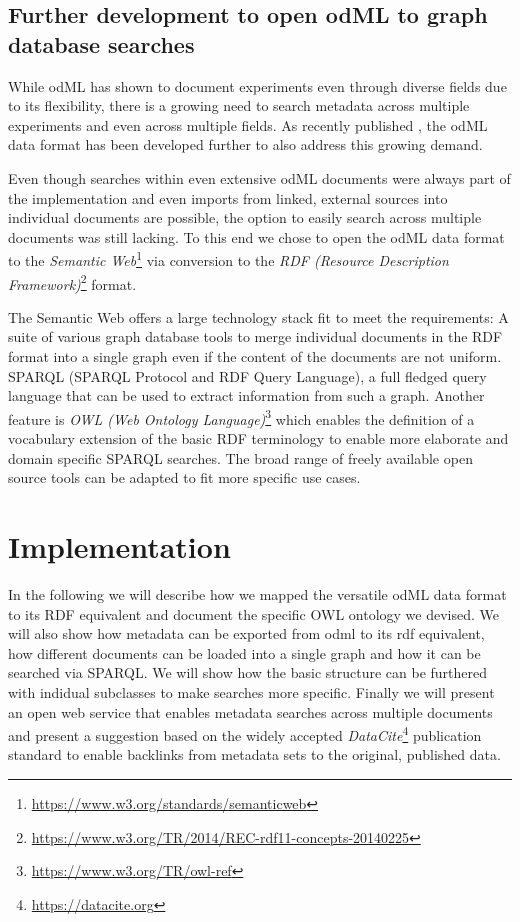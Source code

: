 \documentclass{article}
\begin{document}
\subsection{Further development to open odML to graph database searches}

While odML has shown to document experiments even through diverse fields due to its flexibility, there is a growing need to search metadata across multiple experiments and even across multiple fields. As recently published \cite{Sprenger_2019}, the odML data format has been developed further to also address this growing demand.

Even though searches within even extensive odML documents were always part of the implementation and even imports from linked, external sources into individual documents are possible, the option to easily search across multiple documents was still lacking. To this end we chose to open the odML data format to the \textit{Semantic Web}\footnote{\url{https://www.w3.org/standards/semanticweb}} via conversion to the \textit{RDF (Resource Description Framework)}\footnote{\url{https://www.w3.org/TR/2014/REC-rdf11-concepts-20140225}} format.

The Semantic Web offers a large technology stack fit to meet the requirements: A suite of various graph database tools to merge individual documents in the RDF format into a single graph even if the content of the documents are not uniform. SPARQL (SPARQL Protocol and RDF Query Language), a full fledged query language that can be used to extract information from such a graph. Another feature is \textit{OWL (Web Ontology Language)}\footnote{\url{https://www.w3.org/TR/owl-ref}} which enables the definition of a vocabulary extension of the basic RDF terminology to enable more elaborate and domain specific SPARQL searches. The broad range of freely available open source tools can be adapted to fit more specific use cases.

\section{Implementation}

In the following we will describe how we mapped the versatile odML data format to its RDF equivalent and document the specific OWL ontology we devised. We will also show how metadata can be exported from odml to its rdf equivalent, how different documents can be loaded into a single graph and how it can be searched via SPARQL.
We will show how the basic structure can be furthered with indidual subclasses to make searches more specific.
Finally we will present an open web service that enables metadata searches across multiple documents and present a suggestion based on the widely accepted \textit{DataCite}\footnote{\url{https://datacite.org}} publication standard to enable backlinks from metadata sets to the original, published data.
\end{document}
